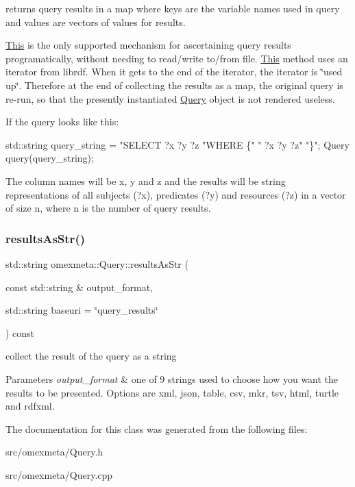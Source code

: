 returns query results in a map where keys are the variable names used in query and values are vectors of values for results. 

\hyperlink{classThis}{This} is the only supported mechanism for ascertaining query results programatically, without needing to read/write to/from file. \hyperlink{classThis}{This} method uses an iterator from librdf. When it gets to the end of the iterator, the iterator is \char`\"{}used up\char`\"{}. Therefore at the end of collecting the results as a map, the original query is re-\/run, so that the presently instantiated \hyperlink{classomexmeta_1_1Query}{Query} object is not rendered useless.

If the query looks like this\+: 
\begin{DoxyCode}
std::string query\_string =   \textcolor{stringliteral}{"SELECT ?x ?y ?z}
\textcolor{stringliteral}{                             "}WHERE \{\textcolor{stringliteral}{"}
\textcolor{stringliteral}{                             "}   ?x ?y ?z\textcolor{stringliteral}{"}
\textcolor{stringliteral}{                             "}\}\textcolor{stringliteral}{";}
\textcolor{stringliteral}{Query query(query\_string);}
\end{DoxyCode}
 The column names will be x, y and z and the results will be string representations of all subjects (?x), predicates (?y) and resources (?z) in a vector of size {\ttfamily n}, where n is the number of query results. \mbox{\label{classomexmeta_1_1Query_a7109dd08bd808bf5a20becb164622ed6}} 
\subsubsection{\texorpdfstring{results\+As\+Str()}{resultsAsStr()}}
{\footnotesize\ttfamily std\+::string omexmeta\+::\+Query\+::results\+As\+Str (\begin{DoxyParamCaption}\item[{const std\+::string \&}]{output\+\_\+format,  }\item[{std\+::string}]{baseuri = {\ttfamily \char`\"{}query\+\_\+results\char`\"{}} }\end{DoxyParamCaption}) const}



collect the result of the query as a string 


\begin{DoxyParams}{Parameters}
{\em output\+\_\+format} & one of 9 strings used to choose how you want the results to be presented. Options are xml, json, table, csv, mkr, tsv, html, turtle and rdfxml. \\
\hline
\end{DoxyParams}


The documentation for this class was generated from the following files\+:\begin{DoxyCompactItemize}
\item 
src/omexmeta/Query.\+h\item 
src/omexmeta/Query.\+cpp\end{DoxyCompactItemize}
